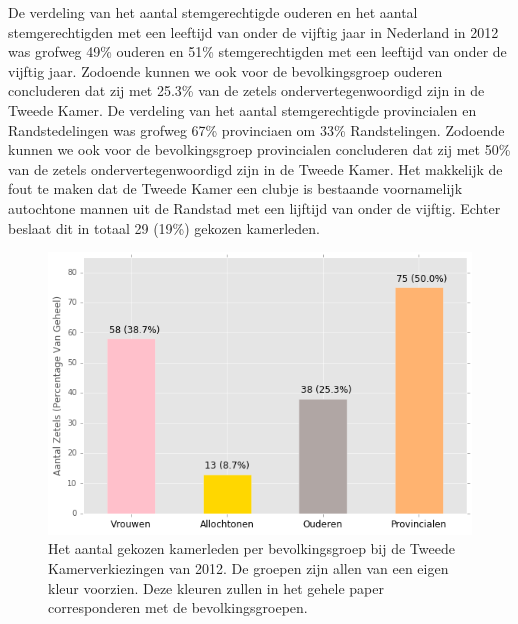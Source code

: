 De verdeling van het aantal stemgerechtigde ouderen en het aantal stemgerechtigden met een leeftijd van onder de vijftig jaar in Nederland in 2012 was grofweg 49\% ouderen en 51\% stemgerechtigden met een leeftijd van onder de vijftig jaar. Zodoende kunnen we ook voor de bevolkingsgroep ouderen concluderen dat zij met 25.3\% van de zetels ondervertegenwoordigd zijn in de Tweede Kamer. De verdeling van het aantal stemgerechtigde provincialen en Randstedelingen was grofweg 67\% provinciaen om 33\% Randstelingen. Zodoende kunnen we ook voor de bevolkingsgroep provincialen concluderen dat zij met 50\% van de zetels ondervertegenwoordigd zijn in de Tweede Kamer. Het makkelijk de fout te maken dat de Tweede Kamer een clubje is bestaande voornamelijk autochtone mannen uit de Randstad met een lijftijd van onder de vijftig. Echter beslaat dit in totaal 29 (19\%) gekozen kamerleden. 

\begin{figure}[H]
\centering

	\includegraphics[width=0.55\linewidth]{aantal_zetels_bevolkingsgroepen.png}

			\caption{Het aantal gekozen kamerleden per bevolkingsgroep bij de Tweede Kamerverkiezingen van 2012. De groepen zijn allen van een eigen kleur voorzien. Deze kleuren zullen in het gehele paper corresponderen met de bevolkingsgroepen.}

\label{fig:az2012}
\end{figure}

